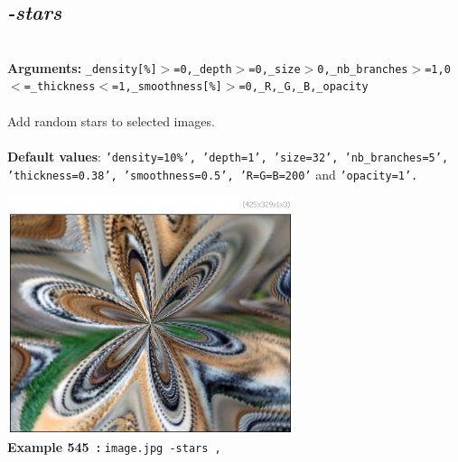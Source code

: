 \documentclass[a4paper,11pt,twoside]{book}
\begin{document}
\subsection{\emph{-stars} }\vspace*{-0.5em}
~\\\textbf{Arguments: } 
{\small \texttt{\_density[\%]$>$=0,\_depth$>$=0,\_size$>$0,\_nb\_branches$>$=1,0$<$=\_thickness$<$=1,\_smoothness[\%]$>$=0,\_R,\_G,\_B,\_opacity}}\\~\\
Add random stars to selected images.
~\\~\\\textbf{Default values}: {\small \texttt{'density=10\%', 'depth=1', 'size=32', 'nb\_branches=5', 'thickness=0.38', 'smoothness=0.5', 'R=G=B=200'} and \texttt{'opacity=1'.}}
\begin{center}\includegraphics[keepaspectratio=true,height=7cm,width=\textwidth]{img/gmic_def545.jpg}\\
{\footnotesize \textbf{Example 545~:} \texttt{image.jpg -stars ,}}
\end{center}
\end{document}
